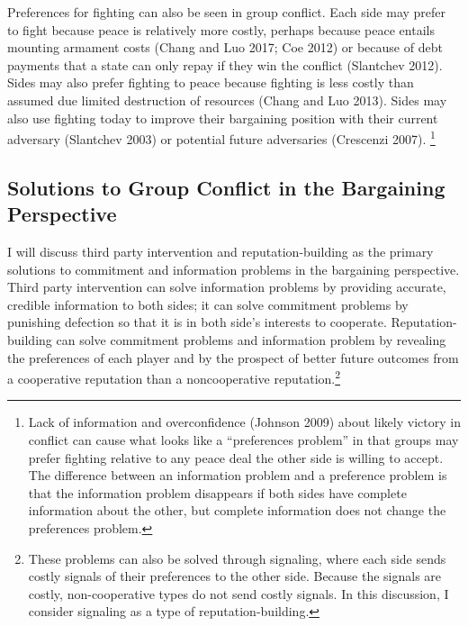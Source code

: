 \documentclass[11pt]{article}
\begin{document}
Preferences for fighting can also be seen in group conflict. Each side
may prefer to fight because peace is relatively more costly, perhaps
because peace entails mounting armament costs (Chang and Luo 2017; Coe
2012) or because of debt payments that a state can only repay if they
win the conflict (Slantchev 2012). Sides may also prefer fighting to
peace because fighting is less costly than assumed due limited
destruction of resources (Chang and Luo 2013). Sides may also use
fighting today to improve their bargaining position with their current
adversary (Slantchev 2003) or potential future adversaries (Crescenzi
2007). \footnote{Lack of information and overconfidence (Johnson 2009)
  about likely victory in conflict can cause what looks like a
  ``preferences problem'' in that groups may prefer fighting relative to
  any peace deal the other side is willing to accept. The difference
  between an information problem and a preference problem is that the
  information problem disappears if both sides have complete information
  about the other, but complete information does not change the
  preferences problem.}

\hypertarget{solutions-to-group-conflict-in-the-bargaining-perspective}{%
\subsection{Solutions to Group Conflict in the Bargaining
Perspective}\label{solutions-to-group-conflict-in-the-bargaining-perspective}}

I will discuss third party intervention and reputation-building as the
primary solutions to commitment and information problems in the
bargaining perspective. Third party intervention can solve information
problems by providing accurate, credible information to both sides; it
can solve commitment problems by punishing defection so that it is in
both side's interests to cooperate. Reputation-building can solve
commitment problems and information problem by revealing the preferences
of each player and by the prospect of better future outcomes from a
cooperative reputation than a noncooperative reputation.\footnote{These
  problems can also be solved through signaling, where each side sends
  costly signals of their preferences to the other side. Because the
  signals are costly, non-cooperative types do not send costly signals.
  In this discussion, I consider signaling as a type of
  reputation-building.}
\end{document}
